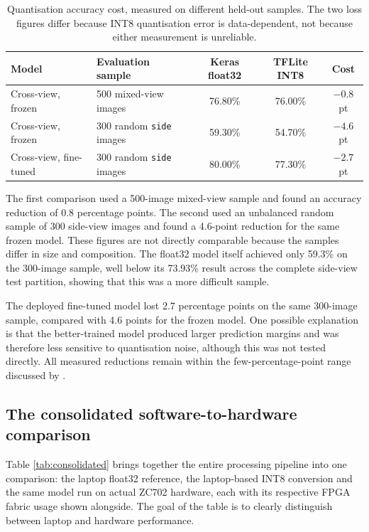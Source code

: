 \begin{table}[htbp]
\centering
\caption{Quantisation accuracy cost, measured on different held-out samples. The two loss figures differ because INT8 quantisation error is data-dependent, not because either measurement is unreliable.}
\label{tab:quantisation-accuracy}
\small
\begin{tabular}{llccc}
\toprule
\textbf{Model} & \textbf{Evaluation sample} & \textbf{Keras float32} & \textbf{TFLite INT8} & \textbf{Cost} \\
\midrule
Cross-view, frozen & 500 mixed-view images & 76.80\% & 76.00\% & $-0.8$ pt \\
Cross-view, frozen & 300 random \texttt{side} images & 59.30\% & 54.70\% & $-4.6$ pt \\
Cross-view, fine-tuned & 300 random \texttt{side} images & 80.00\% & 77.30\% & $-2.7$ pt \\
\bottomrule
\end{tabular}
\end{table}

The first comparison used a 500-image mixed-view sample and found an accuracy reduction of 0.8 percentage points. The second used an unbalanced random sample of 300 side-view images and found a 4.6-point reduction for the same frozen model. These figures are not directly comparable because the samples differ in size and composition. The float32 model itself achieved only 59.3\% on the 300-image sample, well below its 73.93\% result across the complete side-view test partition, showing that this was a more difficult sample.

The deployed fine-tuned model lost 2.7 percentage points on the same 300-image sample, compared with 4.6 points for the frozen model. One possible explanation is that the better-trained model produced larger prediction margins and was therefore less sensitive to quantisation noise, although this was not tested directly. All measured reductions remain within the few-percentage-point range discussed by \citet{abushahla2025quantization}.

\subsection{The consolidated software-to-hardware comparison}
\label{sec:qr-consolidated}

Table \ref{tab:consolidated} brings together the entire processing pipeline into one comparison: the laptop float32 reference, the laptop-based INT8 conversion and the same model run on actual ZC702 hardware, each with its respective FPGA fabric usage shown alongside. The goal of the table is to clearly distinguish between laptop and hardware performance.


